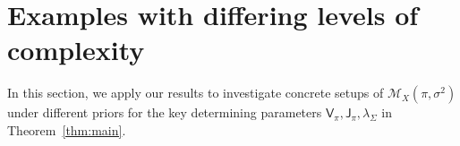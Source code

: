 \documentclass[11pt]{article}
\newcommand{\model}{\mathscr{M}}
\newcommand{\jfunc}{\mathsf{J}}
\begin{document}
%

\section{Examples with differing levels of complexity} \label{sec:applications}

In this section, we apply our results to investigate concrete setups of $\model_X(\pi, \sigma^2)$ under different priors for the key determining parameters $ \mathsf{V}_{\pi}, \jfunc_{\pi}, \lambda_{\Sigma}$ in Theorem~\ref{thm:main}.
\end{document}
